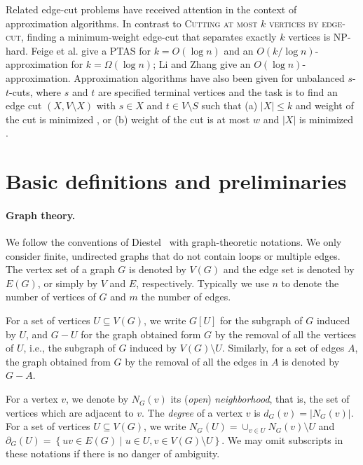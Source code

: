 \documentclass[a4paper,11pt]{article}
\theoremstyle{definition}
\theoremstyle{remark}
\newcommand{\card}[1]{\left\lvert {#1} \right\rvert}
\begin{document}
Related edge-cut problems have received attention in the context of approximation algorithms. In contrast to \textsc{Cutting at most  $k$ vertices by edge-cut}, finding a minimum-weight edge-cut that separates exactly $k$ vertices is NP-hard. Feige et al. \cite{Feige2003643} give a PTAS for $k = O(\log n)$ and an $O(k / \log n)$-approximation for $k = \Omega(\log n)$; Li and Zhang \cite{li2012} give an $O(\log n)$-approximation. Approximation algorithms have also been given for unbalanced $s$-$t$-cuts, where $s$ and $t$ are specified terminal vertices and the task is to find an edge cut $(X, V \setminus X)$ with $s \in X$ and $t \in V \setminus S$ such that (a) $\card{X} \le k$ and weight of the cut is minimized \cite{galbiati2011,li2012}, or (b) weight of the cut is at most $w$ and $\card{X}$ is minimized \cite{hayrapetyan2005}.





\section{Basic definitions and preliminaries}\label{sec:defs}

\paragraph{Graph theory.} We follow the conventions of Diestel~\cite{Diestel10} with graph-theoretic notations. 
We only consider finite, undirected graphs that do not contain loops or multiple
edges.
The vertex set of a graph $G$ is denoted by $V(G)$ and  
the edge set is denoted by $E(G)$, or simply by $V$ and $E$, respectively.
Typically we use $n$ to denote the number of vertices of $G$ and $m$ the number of edges.

For a set of vertices $U\subseteq V(G)$, we write
$G[U]$ for the subgraph of $G$ induced by $U$,
and $G-U$ for the graph obtained form $G$ by the removal of all the vertices of $U$, i.e., the subgraph of $G$ induced by $V(G)\setminus U$.
Similarly, for a set of edges $A$, the graph obtained from $G$ by the removal of all the edges in $A$ is denoted by $G-A$.

For a vertex $v$, we denote by $N_G(v)$ its
(\emph{open}) \emph{neighborhood}, that is, the set of vertices which are
adjacent to $v$. The \emph{degree} of a vertex $v$ is $d_G(v)=\card{N_G(v)}$.
For a set of vertices $U\subseteq V(G)$, we write $N_G(U)=\cup_{v\in U}N_G(v)\setminus U$ and
$\partial_G(U) = \left\{uv\in E(G) \mid u\in U, v\in V(G)\setminus U\right\}$. 
We may omit subscripts in these notations if there is no danger of ambiguity.
\end{document}
